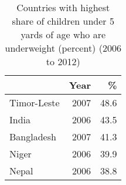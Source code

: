 \begin{table}
\centering
\caption{Countries with highest share of children under 5 yards of age who are underweight (percent) (2006 to 2012)} 
{\footnotesize
\begin{tabular}{lrr}
  \toprule
 & Year & \% \\ 
  \midrule
Timor-Leste & 2007 & 48.6 \\ 
  India & 2006 & 43.5 \\ 
  Bangladesh & 2007 & 41.3 \\ 
  Niger & 2006 & 39.9 \\ 
  Nepal & 2006 & 38.8 \\ 
   \bottomrule
\end{tabular}
}
\end{table}

